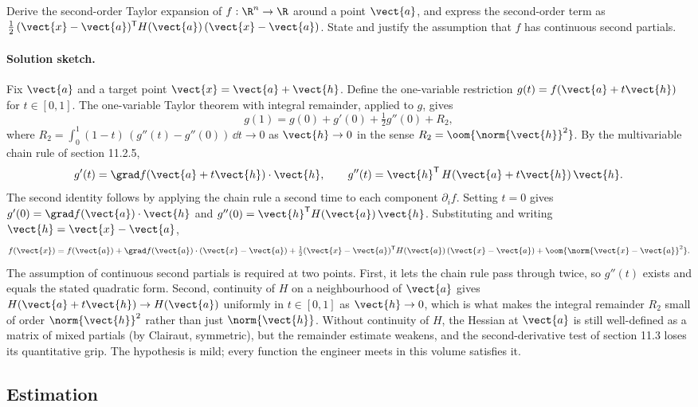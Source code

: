 \begin{exercise}
Derive the second-order Taylor expansion of $f : \R^{n} \to \R$
around a point $\vect{a}$, and express the second-order term as
$\tfrac{1}{2}\,(\vect{x} - \vect{a})^{\mathsf{T}} H(\vect{a})\,
(\vect{x} - \vect{a})$. State and justify the assumption that
$f$ has continuous second partials.

\paragraph{Solution sketch.} Fix $\vect{a}$ and a target point
$\vect{x} = \vect{a} + \vect{h}$. Define the one-variable
restriction $g(t) = f(\vect{a} + t\vect{h})$ for $t \in [0, 1]$.
The one-variable Taylor theorem with integral remainder, applied to
$g$, gives
\[
g(1) = g(0) + g'(0) + \tfrac{1}{2} g''(0) + R_{2},
\]
where $R_{2} = \int_{0}^{1}(1 - t)\,(g''(t) - g''(0))\,\dd t \to 0$
as $\vect{h} \to 0$ in the sense $R_{2} = \oom{\norm{\vect{h}}^{2}}$.
By the multivariable chain rule of section 11.2.5,
\[
g'(t) = \grad f(\vect{a} + t\vect{h}) \cdot \vect{h},
\qquad
g''(t) = \vect{h}^{\mathsf{T}}\,H(\vect{a} + t\vect{h})\,\vect{h}.
\]
The second identity follows by applying the chain rule a second
time to each component $\partial_{i} f$. Setting $t = 0$ gives
$g'(0) = \grad f(\vect{a}) \cdot \vect{h}$ and $g''(0) = \vect{h}^{
\mathsf{T}} H(\vect{a})\,\vect{h}$. Substituting and writing
$\vect{h} = \vect{x} - \vect{a}$,
\[
f(\vect{x}) = f(\vect{a}) + \grad f(\vect{a}) \cdot (\vect{x} -
\vect{a}) + \tfrac{1}{2}(\vect{x} - \vect{a})^{\mathsf{T}}
H(\vect{a})\,(\vect{x} - \vect{a}) + \oom{\norm{\vect{x} - \vect{a}}
^{2}}.
\]
The assumption of continuous second partials is required at two
points. First, it lets the chain rule pass through twice, so $g''(t)$
exists and equals the stated quadratic form. Second, continuity of
$H$ on a neighbourhood of $\vect{a}$ gives $H(\vect{a} + t\vect{h})
\to H(\vect{a})$ uniformly in $t \in [0, 1]$ as $\vect{h} \to 0$,
which is what makes the integral remainder $R_{2}$ small of order
$\norm{\vect{h}}^{2}$ rather than just $\norm{\vect{h}}$. Without
continuity of $H$, the Hessian at $\vect{a}$ is still well-defined
as a matrix of mixed partials (by Clairaut, symmetric), but the
remainder estimate weakens, and the second-derivative test of
section 11.3 loses its quantitative grip. The hypothesis is mild;
every function the engineer meets in this volume satisfies it.
\end{exercise}

\subsection*{Estimation}

